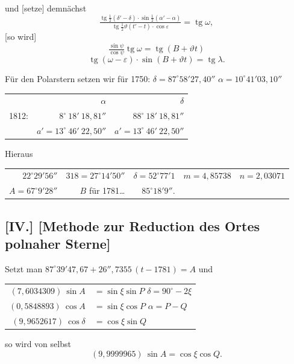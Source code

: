 \documentclass[12pt,a4paper]{article}
\theoremstyle{plain}
\theoremstyle{definition}
\theoremstyle{remark}
\DeclareMathOperator{\tg}{tg}
\begin{document}
\newpage

und [setze] demn\"achst
\[
\tfrac{\tg\tfrac{1}{2}(\delta' - \delta) \cdot \sin\tfrac{1}{2}(\alpha' - \alpha)}{\tg\tfrac{1}{2}\vartheta(t' - t) \cdot \cos\varepsilon} = \tg\omega,
\]
[so wird]
\[
\tfrac{\sin\psi}{\cos\psi} \tg\omega = \tg(B + \vartheta t)
\]
\[
\tg(\omega - \varepsilon) \cdot \sin(B + \vartheta t) = \tg\lambda.
\]

F\"ur den Polarstern setzen wir f\"ur 1750: $\delta = 87^{\circ}58'27{,}40''$ $\alpha = 10^{\circ}41'03{,}10''$
\begin{center}
\begin{tabular}{r@{\quad}r@{\quad}r}
& $\alpha$ & $\delta$ \\
1812: & $8^{\circ}\ 18'\ 18{,}81''$ & $88^{\circ}\ 18'\ 18{,}81''$ \\
& $a' = 13^{\circ}\ 46'\ 22{,}50''$ & $a' = 13^{\circ}\ 46'\ 22{,}50''$
\end{tabular}
\end{center}

Hieraus
\begin{center}
\begin{tabular}{r@{\quad}r@{\quad}r@{\quad}r@{\quad}r}
$22^{\circ}29'56''$ & $318 = 27^{\circ}14'50''$ & $\delta = 52^{\circ}77'1$ & $m = 4{,}85738$ & $n = 2{,}03071$ \\
$A = 67^{\circ}9'28''$ & $B$ f\"ur 1781\ldots & $85^{\circ}18'9''$.
\end{tabular}
\end{center}

\subsection*{[IV.] [Methode zur Reduction des Ortes polnaher Sterne]}

Setzt man $87^{\circ}39'47{,}67 + 26''{,}7355\,(t - 1781) = A$ und
\begin{center}
\begin{tabular}{r@{\ }l}
$(7{,}6034309)\ \sin A$ & $= \sin\xi \sin P$ \quad $\delta = 90^{\circ} - 2\xi$ \\
$(0{,}5848893)\ \cos A$ & $= \sin\xi \cos P$ \quad $\alpha = P - Q$ \\
$(9{,}9652617)\ \cos\delta$ & $= \cos\xi \sin Q$
\end{tabular}
\end{center}
so wird von selbst
\[
(9{,}9999965)\ \sin A = \cos\xi \cos Q.
\]
\end{document}

